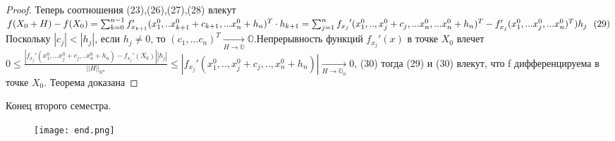 \begin{proof}
	Теперь соотношения (23),(26),(27),(28) влекут $f(X_0+ H) - f(X_0) = \sum_{k =0}^{n-1}{f_{x_{k+1}}'(x_1^0,..x_{k+1}^0+c_{k+1},...x_n^0+h_n)^T \cdot h_{k+1}} = \sum_{j =1}^{n}{f_{x_j}}'(x_1^0,..,x_j^0+c_j,...x_n^0,...x_n^0+h_n)^T - f_{x_j}'(x_1^0,...x_j^0,...x_n^0)^T)h_j \ \ (29) \\ $
	Поскольку $|c_j| < |h_j|$, если $h_j \neq 0$, то $(c_1,...c_n)^T \underset{H \to \mathbb{O}}{\to} \mathbb{O}$.Непрерывность функций $f_{x_j}'(x)$ в точке $X_0$ влечет $0 \leq \frac{|f_{x_j}'(x_1^0,...x_j^0+c_j,..x_n^0+h_n)-f_{x_j}'(X_0)||h_j|}{||H||_{\mathbb{R}^n}}\leq |f_{x_j}'(x_1^0,..,x_j^0+c_j,..,x_n^0+h_n)| \underset{H \to \mathbb{O}_n}{\to}0$, (30) тогда (29) и (30) влекут, что f дифференцируема в точке $X_0$. Теорема доказана
\end{proof}
Конец второго семестра.
\begin{figure}[h]
\centering
\texttt{[image: end.png]}
\label{fig:mpr}
\end{figure}